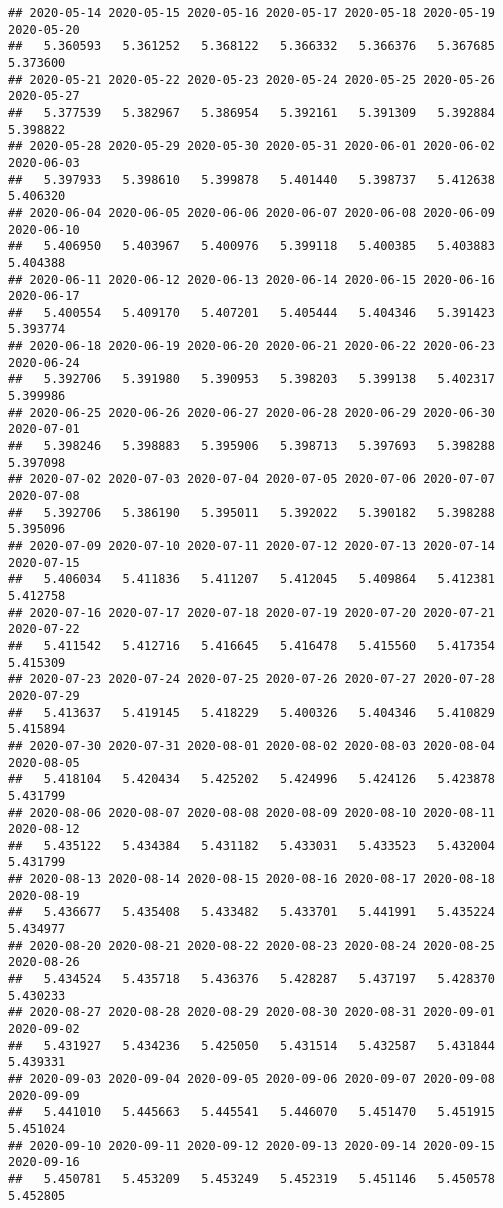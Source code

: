 \documentclass[
]{article}
\begin{document}
\begin{verbatim}
## 2020-05-14 2020-05-15 2020-05-16 2020-05-17 2020-05-18 2020-05-19 2020-05-20 
##   5.360593   5.361252   5.368122   5.366332   5.366376   5.367685   5.373600 
## 2020-05-21 2020-05-22 2020-05-23 2020-05-24 2020-05-25 2020-05-26 2020-05-27 
##   5.377539   5.382967   5.386954   5.392161   5.391309   5.392884   5.398822 
## 2020-05-28 2020-05-29 2020-05-30 2020-05-31 2020-06-01 2020-06-02 2020-06-03 
##   5.397933   5.398610   5.399878   5.401440   5.398737   5.412638   5.406320 
## 2020-06-04 2020-06-05 2020-06-06 2020-06-07 2020-06-08 2020-06-09 2020-06-10 
##   5.406950   5.403967   5.400976   5.399118   5.400385   5.403883   5.404388 
## 2020-06-11 2020-06-12 2020-06-13 2020-06-14 2020-06-15 2020-06-16 2020-06-17 
##   5.400554   5.409170   5.407201   5.405444   5.404346   5.391423   5.393774 
## 2020-06-18 2020-06-19 2020-06-20 2020-06-21 2020-06-22 2020-06-23 2020-06-24 
##   5.392706   5.391980   5.390953   5.398203   5.399138   5.402317   5.399986 
## 2020-06-25 2020-06-26 2020-06-27 2020-06-28 2020-06-29 2020-06-30 2020-07-01 
##   5.398246   5.398883   5.395906   5.398713   5.397693   5.398288   5.397098 
## 2020-07-02 2020-07-03 2020-07-04 2020-07-05 2020-07-06 2020-07-07 2020-07-08 
##   5.392706   5.386190   5.395011   5.392022   5.390182   5.398288   5.395096 
## 2020-07-09 2020-07-10 2020-07-11 2020-07-12 2020-07-13 2020-07-14 2020-07-15 
##   5.406034   5.411836   5.411207   5.412045   5.409864   5.412381   5.412758 
## 2020-07-16 2020-07-17 2020-07-18 2020-07-19 2020-07-20 2020-07-21 2020-07-22 
##   5.411542   5.412716   5.416645   5.416478   5.415560   5.417354   5.415309 
## 2020-07-23 2020-07-24 2020-07-25 2020-07-26 2020-07-27 2020-07-28 2020-07-29 
##   5.413637   5.419145   5.418229   5.400326   5.404346   5.410829   5.415894 
## 2020-07-30 2020-07-31 2020-08-01 2020-08-02 2020-08-03 2020-08-04 2020-08-05 
##   5.418104   5.420434   5.425202   5.424996   5.424126   5.423878   5.431799 
## 2020-08-06 2020-08-07 2020-08-08 2020-08-09 2020-08-10 2020-08-11 2020-08-12 
##   5.435122   5.434384   5.431182   5.433031   5.433523   5.432004   5.431799 
## 2020-08-13 2020-08-14 2020-08-15 2020-08-16 2020-08-17 2020-08-18 2020-08-19 
##   5.436677   5.435408   5.433482   5.433701   5.441991   5.435224   5.434977 
## 2020-08-20 2020-08-21 2020-08-22 2020-08-23 2020-08-24 2020-08-25 2020-08-26 
##   5.434524   5.435718   5.436376   5.428287   5.437197   5.428370   5.430233 
## 2020-08-27 2020-08-28 2020-08-29 2020-08-30 2020-08-31 2020-09-01 2020-09-02 
##   5.431927   5.434236   5.425050   5.431514   5.432587   5.431844   5.439331 
## 2020-09-03 2020-09-04 2020-09-05 2020-09-06 2020-09-07 2020-09-08 2020-09-09 
##   5.441010   5.445663   5.445541   5.446070   5.451470   5.451915   5.451024 
## 2020-09-10 2020-09-11 2020-09-12 2020-09-13 2020-09-14 2020-09-15 2020-09-16 
##   5.450781   5.453209   5.453249   5.452319   5.451146   5.450578   5.452805
\end{verbatim}
\end{document}
